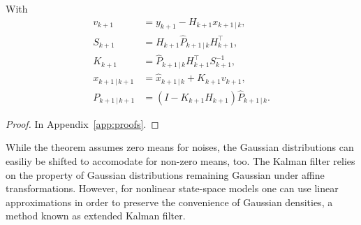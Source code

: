 \begin{theorem}
\begin{enumerate}
            With 
            \begin{subequations}\label{eq:kalmanupdatestep}
                \begin{align}
                    v_{k+1} &= y_{k+1} - H_{k+1}x_{k+1 \, \vert \, k},\\
                    S_{k+1} &= H_{k+1} \hat{P}_{k+1\,\vert\,k} H_{k+1}^{\top},\\
                    K_{k+1} &= \hat{P}_{k+1\,\vert\,k}  H_{k+1}^{\top} S_{k+1}^{-1},\\
                    x_{k+1\,\vert\,k+1} &= \hat{x}_{k+1\,\vert\,k} + K_{k+1} v_{k+1},\\
                    P_{k+1\,\vert\,k+1} &= (I-K_{k+1}H_{k+1})\hat{P}_{k+1\,\vert\,k}.
                \end{align}
            \end{subequations}
    \end{enumerate}
\end{theorem}
\begin{proof}
    In Appendix~\ref{app:proofs}.
\end{proof}
While the theorem assumes zero means for noises, the Gaussian distributions can easiliy be shifted to accomodate for non-zero means, too.
The Kalman filter relies on the property of Gaussian distributions remaining Gaussian under affine transformations.
However, for nonlinear state-space models one can use linear approximations in order to preserve the convenience of Gaussian densities, a method known as extended Kalman filter.

